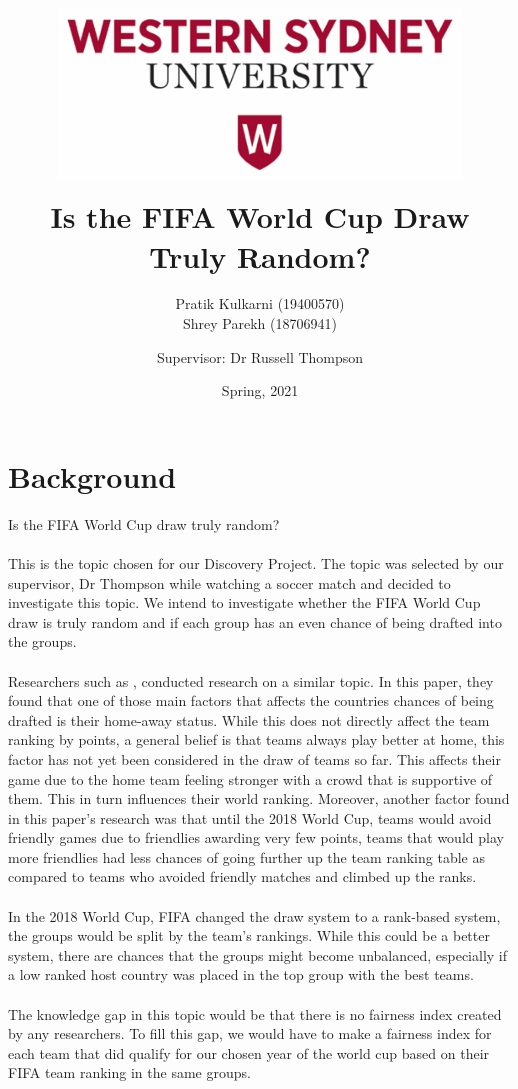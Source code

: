 \documentclass[11pt,a4paper]{scrartcl}
\title{
\includegraphics[height=5cm,width=0.8\textwidth]{WSU.PNG}\\
Is the FIFA World Cup Draw Truly Random?}
\author{Pratik Kulkarni (19400570)\\ Shrey Parekh (18706941)}
\affil{Project proposal for 301111 Discovery Project}
\author{Supervisor: Dr Russell Thompson}
\affil{School of Computer, Data and Mathematical Sciences, \\ Western Sydney University}
\date{Spring, 2021}
\begin{document}
\maketitle


\newpage

\renewcommand\contentsname{Table of Contents}

\tableofcontents

\newpage

\section{Background}


Is the FIFA World Cup draw truly random?
\\ \\
This is the topic chosen for our Discovery Project. The topic was selected by our supervisor, Dr Thompson while watching a soccer match and decided to investigate this topic.
We intend to investigate whether the FIFA World Cup draw is truly random and if each group has an even chance of being drafted into the groups. 
\\ \\
Researchers such as \citet{cea2020analytics}, conducted research on a similar topic. In this paper, they found that one of those main factors that affects the countries chances of being drafted is their home-away status. While this does not directly affect the team ranking by points, a general belief is that teams always play better at home, this factor has not yet been considered in the draw of teams so far. This affects their game due to the home team feeling stronger with a crowd that is supportive of them. This in turn influences their world ranking. Moreover, another factor found in this paper’s research was that until the 2018 World Cup, teams would avoid friendly games due to friendlies awarding very few points, teams that would play more friendlies had less chances of going further up the team ranking table as compared to teams who avoided friendly matches and climbed up the ranks. 
\\ \\
In the 2018 World Cup, FIFA changed the draw system to a rank-based system, the groups would be split by the team’s rankings. While this could be a better system, there are chances that the groups might become unbalanced, especially if a low ranked host country was placed in the top group with the best teams.
\\ \\
The knowledge gap in this topic would be that there is no fairness index created by any researchers. To fill this gap, we would have to make a fairness index for each team that did qualify for our chosen year of the world cup based on their FIFA team ranking in the same groups.
\end{document}
